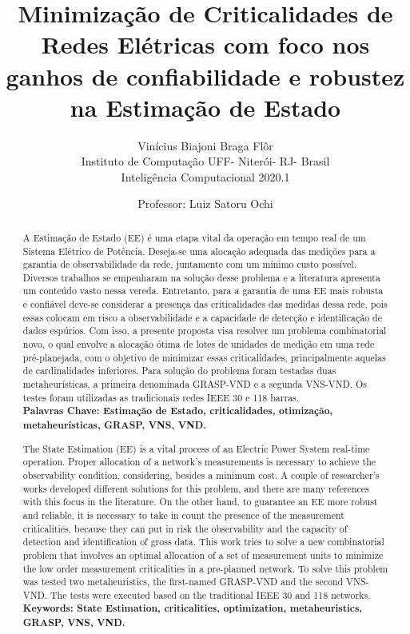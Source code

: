 \documentclass[12pt]{article}
\title{Minimização de Criticalidades de Redes Elétricas com foco nos ganhos de confiabilidade e robustez na Estimação de Estado}
\author{Vinícius Biajoni Braga Flôr\\ Instituto de Computação UFF- Niterói- RJ- Brasil\\ Inteligência Computacional 2020.1}
\date{Professor: Luiz Satoru Ochi}
\begin{document}
\maketitle

\begin{abstract}
	A Estimação de Estado (EE) é uma etapa vital da operação em tempo real de um Sistema Elétrico de Potência. Deseja-se uma alocação adequada das medições para a garantia de observabilidade da rede, juntamente com um mínimo custo possível. Diversos trabalhos se empenharam na solução desse problema e a literatura apresenta um conteúdo vasto nessa vereda. Entretanto, para a garantia de uma EE mais robusta e confiável deve-se considerar a presença das criticalidades das medidas dessa rede, pois essas colocam em risco a observabilidade e a capacidade de detecção e identificação de dados espúrios. Com isso, a presente proposta visa resolver um problema combinatorial novo, o qual envolve a alocação ótima de lotes de unidades de medição em uma rede pré-planejada, com o objetivo de minimizar essas criticalidades, principalmente aquelas de cardinalidades inferiores. Para solução do problema foram testadas duas metaheurísticas, a primeira denominada GRASP-VND e a segunda VNS-VND. Os testes foram utilizadas as tradicionais redes IEEE 30 e 118 barras.\\
	
	\textbf{Palavras Chave: Estimação de Estado, criticalidades, otimização, metaheurísticas, GRASP, VNS, VND.}
\end{abstract}

\begin{abstract}
	The State Estimation (EE) is a vital process of an Electric Power System real-time operation. Proper allocation of a network's measurements is necessary to achieve the observability condition, considering, besides a minimum cost. A couple of researcher's works developed different solutions for this problem, and there are many references with this focus in the literature. On the other hand, to guarantee an EE more robust and reliable, it is necessary to take in count the presence of the measurement criticalities, because they can put in risk the observability and the capacity of detection and identification of gross data. This work tries to solve a new combinatorial problem that involves an optimal allocation of a set of measurement units to minimize the low order measurement criticalities in a pre-planned network. To solve this problem was tested two metaheuristics, the first-named GRASP-VND and the second VNS-VND. The tests were executed based on the traditional IEEE 30 and 118 networks.\\
	
	
	\textbf{Keywords: State Estimation, criticalities, optimization, metaheuristics, GRASP, VNS, VND.}
\end{abstract}
\end{document}
